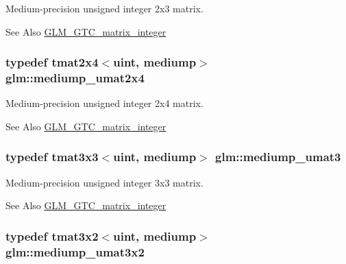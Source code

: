 Medium-\/precision unsigned integer 2x3 matrix. \begin{DoxySeeAlso}{See Also}
\hyperlink{group__gtc__matrix__integer}{G\-L\-M\-\_\-\-G\-T\-C\-\_\-matrix\-\_\-integer} 
\end{DoxySeeAlso}
\hypertarget{group__gtc__matrix__integer_ga972445669c6e6652716f3f0b664b94cd}{
\subsubsection[{mediump\-\_\-umat2x4}]{\setlength{\rightskip}{0pt plus 5cm}typedef tmat2x4$<$uint, mediump$>$ {\bf glm\-::mediump\-\_\-umat2x4}}}\label{group__gtc__matrix__integer_ga972445669c6e6652716f3f0b664b94cd}
Medium-\/precision unsigned integer 2x4 matrix. \begin{DoxySeeAlso}{See Also}
\hyperlink{group__gtc__matrix__integer}{G\-L\-M\-\_\-\-G\-T\-C\-\_\-matrix\-\_\-integer} 
\end{DoxySeeAlso}
\hypertarget{group__gtc__matrix__integer_ga953d4cb3e70d85567756b3fbcca0e9e9}{
\subsubsection[{mediump\-\_\-umat3}]{\setlength{\rightskip}{0pt plus 5cm}typedef tmat3x3$<$uint, mediump$>$ {\bf glm\-::mediump\-\_\-umat3}}}\label{group__gtc__matrix__integer_ga953d4cb3e70d85567756b3fbcca0e9e9}
Medium-\/precision unsigned integer 3x3 matrix. \begin{DoxySeeAlso}{See Also}
\hyperlink{group__gtc__matrix__integer}{G\-L\-M\-\_\-\-G\-T\-C\-\_\-matrix\-\_\-integer} 
\end{DoxySeeAlso}
\hypertarget{group__gtc__matrix__integer_ga62243caa5b85b1cf91021ce6ffc21183}{
\subsubsection[{mediump\-\_\-umat3x2}]{\setlength{\rightskip}{0pt plus 5cm}typedef tmat3x2$<$uint, mediump$>$ {\bf glm\-::mediump\-\_\-umat3x2}}}\label{group__gtc__matrix__integer_ga62243caa5b85b1cf91021ce6ffc21183}
